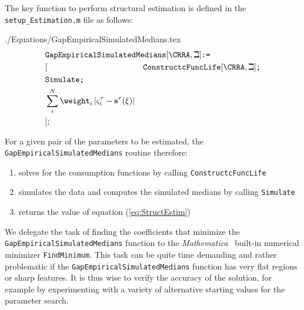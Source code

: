 \documentclass[titlepage]{\econtex}
\newcommand{\Mma}{\textit{Mathematica}}
\begin{document}
  The key function to perform structural estimation is defined in the \texttt{setup\_Estimation.m} file as follows:
  \begin{verbatimwrite}{./Equations/GapEmpiricalSimulatedMedians.tex}
    \begin{equation}\begin{gathered}\begin{aligned}
      \lefteqn{    \texttt{GapEmpiricalSimulatedMedians$[\CRRA,\beth]$:=}}    \nonumber \\
                                                                           &[&\texttt{ConstructcFuncLife$[\CRRA,\beth]$;}\nonumber\\
                                                                           &\texttt{Simulate;}\nonumber\\
                                                                           &\sum\limits_{i}^{N}\weight _{i}\left|\varsigma_{i}^{\tau }-\mathbf{s}^{\tau}(\xi )\right| \nonumber\\
                                                                           &];&\nonumber
    \end{aligned}\end{gathered}\end{equation}
  \end{verbatimwrite}
  
  For a given pair of the parameters to be estimated, the \texttt{GapEmpiricalSimulatedMedians} routine therefore:
  \begin{enumerate}
  \item solves for the consumption functions by calling \texttt{ConstructcFuncLife}
  \item simulates the data and computes the simulated medians by calling \texttt{Simulate}
  \item returns the value of equation (\ref{eq:StructEstim})
  \end{enumerate}

  We delegate the task of finding the coefficients that minimize the
  \texttt{GapEmpiricalSimulatedMedians} function to the \Mma~
  built-in numerical minimizer \texttt{FindMinimum}.  This task can be
  quite time demanding and rather problematic if the
  \texttt{GapEmpiricalSimulatedMedians} function has very flat regions
  or sharp features. It is thus wise to verify the accuracy of the
  solution, for example by experimenting with a variety of alternative starting values for the
  parameter search.
\end{document}
